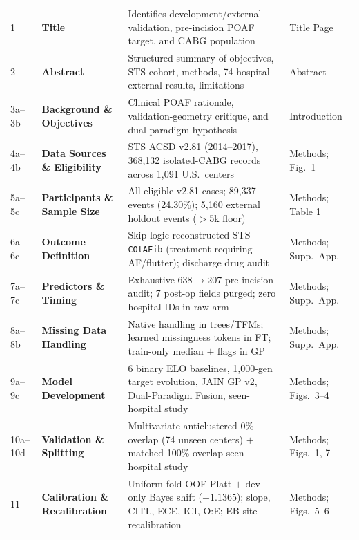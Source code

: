 \begin{table}[t]
\centering\tablefont
\caption{}
\label{tab:supp_tripod}
\setlength{\tabcolsep}{4.2pt}
\renewcommand{\arraystretch}{1.04}
\begin{tabularx}{\textwidth}{@{}L{1.15cm}L{3.1cm}YL{2.65cm}@{}}
\toprule
{} &  &  &  \\
 & \textbf{Title} & Identifies development/external validation, pre-incision POAF target, and CABG population & Title Page \\
2 & \textbf{Abstract} & Structured summary of objectives, STS cohort, methods, 74-hospital external results, limitations & Abstract \\
3a--3b & \textbf{Background \& Objectives} & Clinical POAF rationale, validation-geometry critique, and dual-paradigm hypothesis & Introduction \\
4a--4b & \textbf{Data Sources \& Eligibility} & STS ACSD v2.81 (2014--2017), 368,132 isolated-CABG records across 1,091 U.S.\ centers & Methods; Fig.\ 1 \\
5a--5c & \textbf{Participants \& Sample Size} & All eligible v2.81 cases; 89,337 events (24.30\%); 5,160 external holdout events ($>$5k floor) & Methods; Table 1 \\
6a--6c & \textbf{Outcome Definition} & Skip-logic reconstructed STS \texttt{COtAFib} (treatment-requiring AF/flutter); discharge drug audit & Methods; Supp.\ App. \\
7a--7c & \textbf{Predictors \& Timing} & Exhaustive 638$\to$207 pre-incision audit; 7 post-op fields purged; zero hospital IDs in raw arm & Methods; Supp.\ App. \\
8a--8b & \textbf{Missing Data Handling} & Native handling in trees/TFMs; learned missingness tokens in FT; train-only median $+$ flags in GP & Methods; Supp.\ App. \\
9a--9c & \textbf{Model Development} & 6 binary ELO baselines, 1,000-gen target evolution, JAIN GP v2, Dual-Paradigm Fusion, seen-hospital study & Methods; Figs.\ 3--4 \\
10a--10d & \textbf{Validation \& Splitting} & Multivariate anticlustered 0\%-overlap (74 unseen centers) $+$ matched 100\%-overlap seen-hospital study & Methods; Figs.\ 1, 7 \\
11 & \textbf{Calibration \& Recalibration} & Uniform fold-OOF Platt $+$ dev-only Bayes shift ($-1.1365$); slope, CITL, ECE, ICI, O:E; EB site recalibration & Methods; Figs.\ 5--6 \\

\end{tabularx}
\end{table}
